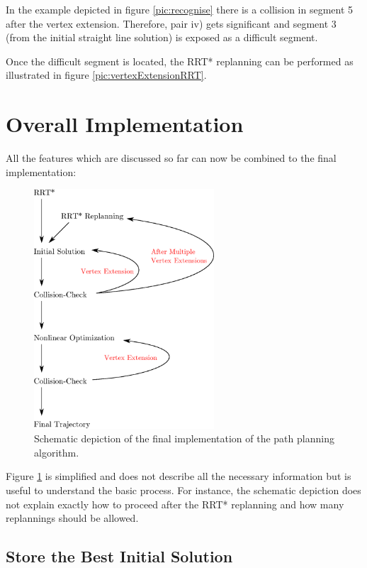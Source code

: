 In the example depicted in figure \ref{pic:recognise} there is a collision in segment 5 after the vertex extension. 
Therefore, pair iv) gets significant and segment 3 (from the initial straight line solution) is exposed as a difficult segment.\newline

Once the difficult segment is located, the RRT* replanning can be performed as illustrated in figure \ref{pic:vertexExtensionRRT}.

\section{Overall Implementation}

All the features which are discussed so far can now be combined to the final implementation: \newline

\begin{figure}[H]
   \centering
   \includegraphics[width=0.6\textwidth]{pics/overall.eps}
   \caption{Schematic depiction of the final implementation of the path planning algorithm.}
   \label{pic:overall}
\end{figure}

Figure \ref{pic:overall} is simplified and does not describe all the necessary information but is useful to understand the basic process. For instance, the schematic depiction does not explain exactly how to proceed after the RRT* replanning and how many replannings should be allowed. 

\subsection{Store the Best Initial Solution}

